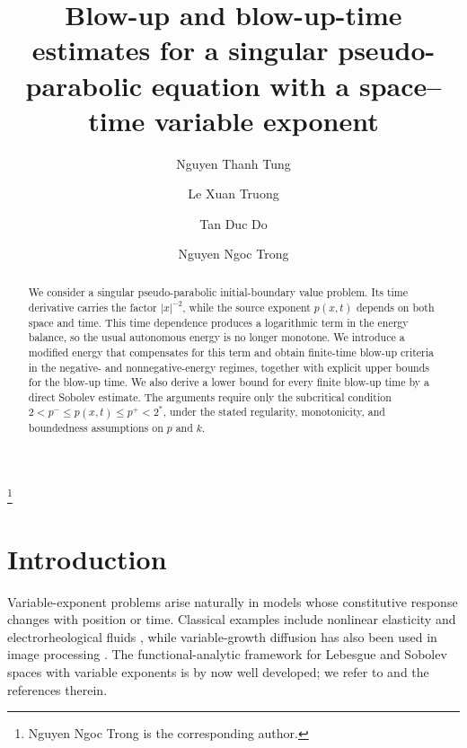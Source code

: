 \documentclass[12pt,reqno]{amsart}
\theoremstyle{definition}
\theoremstyle{remark}
\numberwithin{equation}{section}
\begin{document}
\title[Blow-up time estimates]{Blow-up and blow-up-time estimates for a singular pseudo-parabolic equation with a space--time variable exponent}

\author{Nguyen Thanh Tung}
\address{Nguyen Thanh Tung, Ho Chi Minh City University of Education, Vietnam}

\author{Le Xuan Truong}
\address{Le Xuan Truong, University of Economics Ho Chi Minh City (UEH), Vietnam}

\author{Tan Duc Do}
\address{Tan Duc Do, University of Economics Ho Chi Minh City (UEH), Vietnam}

\author{Nguyen Ngoc Trong}
\address{Nguyen Ngoc Trong, Group of Analysis and Applied Mathematics, Department of Mathematics, Ho Chi Minh City University of Education, Vietnam}
\thanks{Nguyen Ngoc Trong is the corresponding author.}


\begin{abstract}
We consider a singular pseudo-parabolic initial-boundary value problem. Its time derivative carries the factor $|x|^{-2}$, while the source exponent $p(x,t)$ depends on both space and time. This time dependence produces a logarithmic term in the energy balance, so the usual autonomous energy is no longer monotone. We introduce a modified energy that compensates for this term and obtain finite-time blow-up criteria in the negative- and nonnegative-energy regimes, together with explicit upper bounds for the blow-up time. We also derive a lower bound for every finite blow-up time by a direct Sobolev estimate. The arguments require only the subcritical condition $2<p^-\le p(x,t)\le p^+<2^*$, under the stated regularity, monotonicity, and boundedness assumptions on $p$ and $k$.
\end{abstract}

\maketitle

\section{Introduction}

Variable-exponent problems arise naturally in models whose constitutive response changes with position or time. Classical examples include nonlinear elasticity and electrorheological fluids \cite{Hal,AM,DR,Ruz}, while variable-growth diffusion has also been used in image processing \cite{ANA}. The functional-analytic framework for Lebesgue and Sobolev spaces with variable exponents is by now well developed; we refer to \cite{DHHR} and the references therein.
\end{document}
